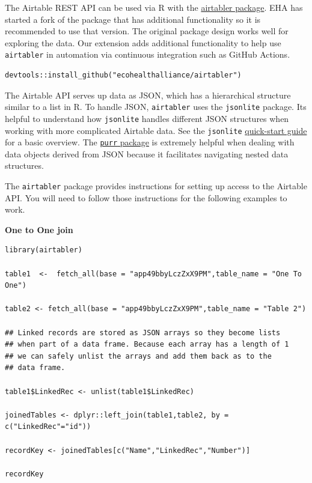 \documentclass[
]{book}
\begin{document}
The Airtable REST API can be used via R with the \href{https://github.com/ecohealthalliance/airtabler}{airtabler package}. EHA has started a fork of the package that has additional functionality so it is recommended to use that version. The original package design works well for exploring the data. Our extension adds additional functionality to help use \texttt{airtabler} in automation via continuous integration such as GitHub Actions.

\begin{verbatim}
devtools::install_github("ecohealthalliance/airtabler")
\end{verbatim}

The Airtable API serves up data as JSON, which has a hierarchical structure similar to a list in R. To handle JSON, \texttt{airtabler} uses the \texttt{jsonlite} package. Its helpful to understand how \texttt{jsonlite} handles different JSON structures when working with more complicated Airtable data. See the \texttt{jsonlite} \href{https://cran.r-project.org/web/packages/jsonlite/vignettes/json-aaquickstart.html}{quick-start guide} for a basic overview. The \href{https://purrr.tidyverse.org/}{\texttt{purr} package} is extremely helpful when dealing with data objects derived from JSON because it facilitates navigating nested data structures.

The \texttt{airtabler} package provides instructions for setting up access to the Airtable API. You will need to follow those instructions for the following examples to work.

\textbf{One to One join}

\begin{verbatim}
library(airtabler)

table1  <-  fetch_all(base = "app49bbyLczZxX9PM",table_name = "One To One")

table2 <- fetch_all(base = "app49bbyLczZxX9PM",table_name = "Table 2")

## Linked records are stored as JSON arrays so they become lists 
## when part of a data frame. Because each array has a length of 1
## we can safely unlist the arrays and add them back as to the 
## data frame.

table1$LinkedRec <- unlist(table1$LinkedRec)

joinedTables <- dplyr::left_join(table1,table2, by = c("LinkedRec"="id"))

recordKey <- joinedTables[c("Name","LinkedRec","Number")]

recordKey

\end{verbatim}
\end{document}
